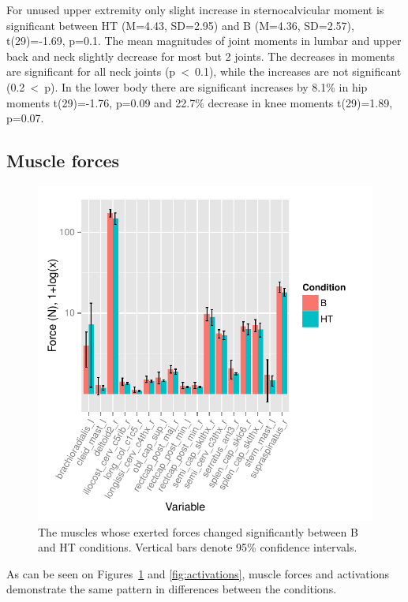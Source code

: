 For unused upper extremity only slight increase in sternocalvicular moment is significant between HT (M=4.43, SD=2.95) and B (M=4.36, SD=2.57), t(29)=-1.69, p=0.1. The mean magnitudes of joint moments in lumbar and upper back and neck slightly decrease for most but 2 joints. The decreases in moments are significant for all neck joints (p~\textless~0.1), while the increases are not significant (0.2~\textless~p).
In the lower body there are significant increases by 8.1\% in hip moments t(29)=-1.76, p=0.09 and 22.7\% decrease in knee moments t(29)=1.89, p=0.07.



\subsection{Muscle forces}

\begin{figure}[tb]
\centering%
\includegraphics[width=\columnwidth]{img/Forces}%
\caption{The muscles whose exerted forces changed significantly between B and HT conditions. Vertical bars denote 95\% confidence intervals.}%
\label{fig:forces}
\end{figure}


As can be seen on Figures~\ref{fig:forces} and \ref{fig:activations}, muscle forces and activations demonstrate the same pattern in differences between the conditions.

